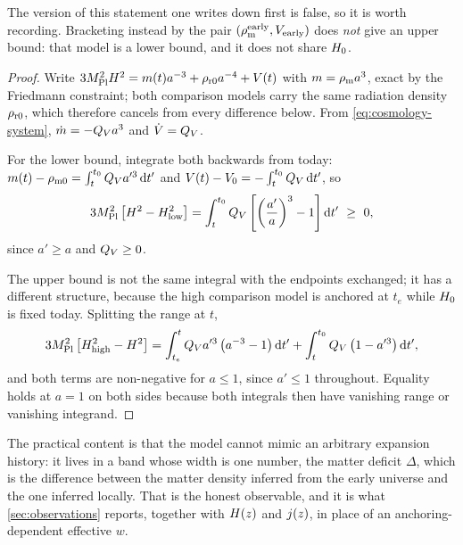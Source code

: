 \begin{remark}\label{rem:sandwich-naive}
  The version of this statement one writes down first is false, so it is worth
  recording. Bracketing instead by the pair
  $(\rho_{\rm m}^{\rm early},V_{\rm early})$ does \emph{not} give an upper
  bound: that model is a lower bound, and it does not share $H_{0}$.
\end{remark}

\begin{proof}
  Write $3M_{\mathrm{Pl}}^2H^2=m(t)a^{-3}+\rho_{\rm r0}a^{-4}+V(t)$ with
  $m=\rho_{\mathrm{m}} a^3$, exact by the Friedmann constraint; both comparison models
  carry the same radiation density $\rho_{\rm r0}$, which therefore cancels
  from every difference below. From \cref{eq:cosmology-system},
  $\dot m=-Q_{V} a^3$ and $\dot {V}=Q_{V}$.

  For the lower bound, integrate both backwards from today:
  $m(t)-\rho_{\rm m0}=\int_t^{t_0}Q_{V} a'^3\,\mathrm{d} t'$ and
  $V(t)-V_0=-\int_t^{t_0}Q_{V}\,\mathrm{d} t'$, so
  \begin{equation}\label{eq:positivity-sandwich-lower}
    3\Mpl^2\left[\Hub^2-\Hub_{\rm low}^2\right]
    =\int_t^{t_0}\QV\left[\left(\frac{a'}{a}\right)^{3}-1\right]\dd t'\ \ge\ 0 ,
  \end{equation}
  since $a'\ge a$ and $Q_{V}\ge0$.

  The upper bound is not the same integral with the endpoints exchanged; it has
  a different structure, because the high comparison model is anchored at
  $t_e$ while $H_{0}$ is fixed today. Splitting the range at $t$,
  \begin{equation}\label{eq:positivity-sandwich-upper}
    3M_{\mathrm{Pl}}^2\left[H_{\rm high}^2-H^2\right]
    =\int_{t_e}^{t}Q_{V} a'^3\left(a^{-3}-1\right)\mathrm{d} t'
    +\int_{t}^{t_0}Q_{V}\left(1-a'^3\right)\mathrm{d} t' ,
  \end{equation}
  and both terms are non-negative for $a\le1$, since $a'\le1$ throughout.
  Equality holds at $a=1$ on both sides because both integrals then have
  vanishing range or vanishing integrand.
\end{proof}

The practical content is that the model cannot mimic an arbitrary expansion
history: it lives in a band whose width is one number, the matter deficit
$\Delta$, which is the difference between the matter density inferred from the
early universe and the one inferred locally. That is the honest observable, and
it is what \cref{sec:observations} reports, together with $H(z)$ and
$j(z)$, in place of an anchoring-dependent effective $w$.

